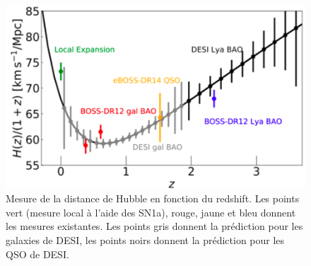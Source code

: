\documentclass[11pt, twoside, a4paper, openright]{report}
\begin{document}
\begin{figure}
  \centering
  \includegraphics[scale=0.3]{../img/eBOSS/DesiVsEboss}
  \caption{Mesure de la distance de Hubble en fonction du redshift. Les points vert (mesure local \`a l'aide des SN1a), rouge, jaune et bleu donnent les mesures existantes. Les points gris donnent la prédiction pour les galaxies de DESI, les points noirs donnent la prédiction pour les QSO de DESI.}
  \label{fig:DesiVsEboss}
\end{figure}




\end{document}
